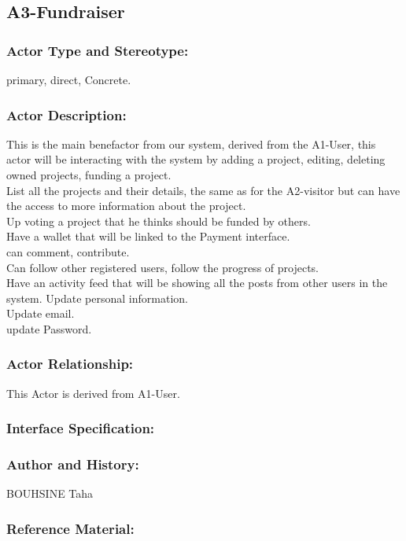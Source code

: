 \documentclass[11pt, openany]{report}
\begin{document}
\clearpage

\subsection{A3-Fundraiser}
\label{A3}
\subsubsection{Actor Type and Stereotype:}
primary, direct, Concrete.
\subsubsection{Actor Description:}
This is the main benefactor from our system, derived from the A1-User, this actor will be interacting with the system by adding a project, editing, deleting owned projects, funding a project.\\
List all the projects and their details, the same as for the A2-visitor but can have the access to more information about the project.\\
Up voting a project that he thinks should be funded by others.\\
Have a wallet that will be linked to the Payment interface.\\
can comment, contribute.\\
Can follow other registered users, follow the progress of projects.\\
Have an activity feed that will be showing all the posts from other users in the system.
Update personal information.\\
Update email.\\
update Password.\\
\subsubsection{Actor Relationship:}
This Actor is derived from A1-User.
\subsubsection{Interface Specification:}
\subsubsection{Author and History:}
BOUHSINE Taha
\subsubsection{Reference Material:}
\end{document}
